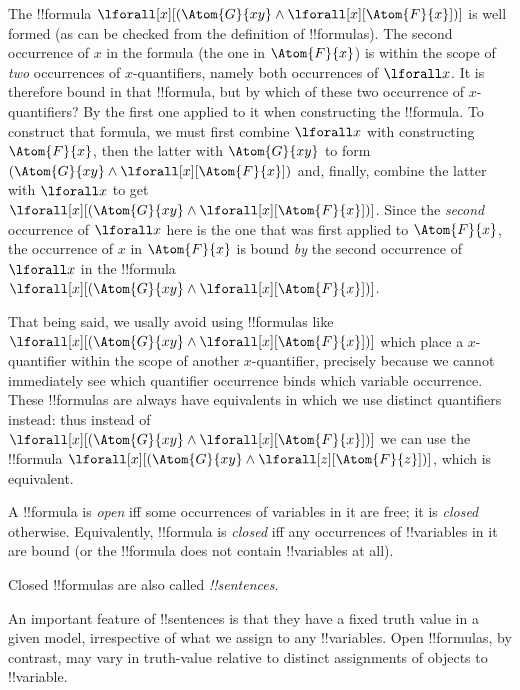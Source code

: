 \documentclass[../../../../include/open-logic-section]{subfiles}
\begin{document}
The !!{formula}
$\lforall[x][(\Atom{G}{xy}\land\lforall[x][\Atom{F}{x}])]$ is well
formed (as can be checked from the definition of !!{formula}s). The
second occurrence of $x$ in the formula (the one in $\Atom{F}{x}$) is
within the scope of \emph{two} occurrences of $x$-quantifiers, namely
both occurrences of $\lforall x$. It is therefore bound in that
!!{formula}, but by which of these two occurrence of $x$-quantifiers?
By the first one applied to it when constructing the !!{formula}. 
To construct that formula, we must first combine $\lforall x$ with
 constructing $\Atom{F}{x}$, then the latter with $\Atom{G}{xy}$ to 
 form $(\Atom{G}{xy}\land\lforall[x][\Atom{F}{x}])$ and, finally, 
 combine the latter with $\lforall x$ to get 
 $\lforall[x][(\Atom{G}{xy}\land\lforall[x][\Atom{F}{x}])]$. Since the
 \emph{second} occurrence of $\lforall x$ here is the one that was 
 first applied to $\Atom{F}{x}$, the occurrence of $x$ in $\Atom{F}{x}$
 is bound \emph{by} the second occurrence of $\lforall x$ in the
 !!{formula} 
 $\lforall[x][(\Atom{G}{xy}\land\lforall[x][\Atom{F}{x}])]$.

That being said, we usally avoid using !!{formula}s like 
$\lforall[x][(\Atom{G}{xy}\land\lforall[x][\Atom{F}{x}])]$ which place
a $x$-quantifier within the scope of another $x$-quantifier, precisely
because we cannot immediately see which quantifier occurrence binds
which variable occurrence. These !!{formula}s are always have 
equivalents in which we use distinct quantifiers instead: thus instead
of 
$\lforall[x][(\Atom{G}{xy}\land\lforall[x][\Atom{F}{x}])]$ we can use
the !!{formula} 
$\lforall[x][(\Atom{G}{xy}\land\lforall[z][\Atom{F}{z}])]$, which is 
equivalent. 

\begin{defn}
A !!{formula} is \emph{open} iff some occurrences of variables
in it are free; it is \emph{closed} otherwise. Equivalently, 
!!{formula} is \emph{closed} iff any
occurrences of !!{variable}s in it are bound (or the !!{formula} does
not contain !!{variable}s at all).

Closed !!{formula}s are also called \emph{!!{sentence}s}.
\end{defn}

An important feature of !!{sentence}s is that they have a fixed truth
value in a given model, irrespective of what we assign to any
!!{variable}s. Open !!{formula}s, by contrast, may vary in truth-value
relative to distinct assignments of objects to !!{variable}.
\end{document}
